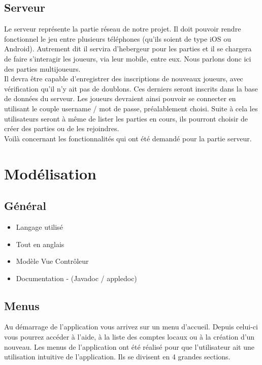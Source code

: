 \documentclass[a4paper,11pt]{report}
\begin{document}
		\subsection{Serveur}
		
		Le serveur représente la partie réseau de notre projet. Il doit pouvoir
		rendre fonctionnel le jeu entre plusieurs téléphones (qu'ils soient de type
		iOS ou Android). Autrement dit il servira d'hebergeur pour les parties et
		il se chargera de faire s'interagir les joueurs, via leur mobile, entre eux.
		Nous parlons donc ici des parties multijoueurs.\\ 
		Il devra être capable d'enregistrer des inscriptions de nouveaux joueurs, avec
		vérification qu'il n'y ait pas de doublons. Ces derniers seront inscrits dans 
		la base de données du serveur. Les joueurs devraient ainsi
		pouvoir se connecter en utilisant le couple username / mot de passe,
		préalablement choisi. Suite à cela les utilisateurs seront à même de lister
		les parties en cours, ils pourront choisir de créer des parties ou de les rejoindres.\\
		Voilà concernant les fonctionnalités qui ont été demandé pour la partie
		serveur.
	
	\section{Modélisation}
		\subsection{Général}
			\begin{itemize}
				\item{Langage utilisé}
				\item{Tout en anglais}
				\item{Modèle Vue Contrôleur}
				\item{Documentation - (Javadoc / appledoc)}
			\end{itemize}
			
		\subsection{Menus}
		Au démarrage de l'application vous arrivez sur un menu d'accueil. Depuis
		celui-ci vous pourrez accéder à l'aide, à la liste des comptes locaux ou à la
		création d'un nouveau.
		Les menus de l'application ont été réalisé pour que l'utilisateur ait
		une utilisation intuitive de l'application. Ils se divisent en 4 grandes sections.
		
\end{document}
